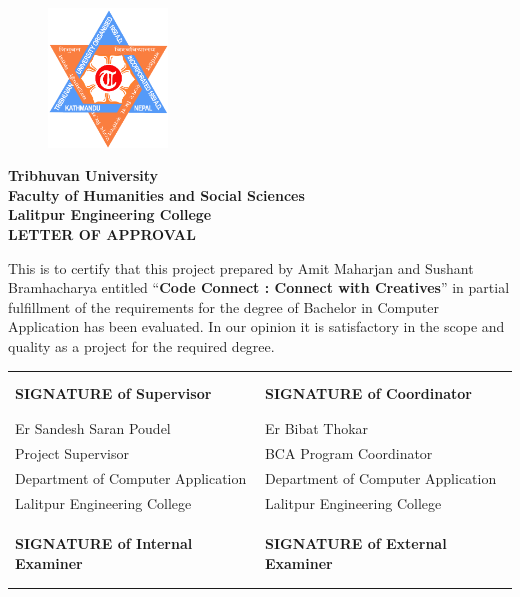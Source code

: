\begin{figure}
    \centering
    \includegraphics[width=1.25in]{img/Graphics/TUlogo.png}
\end{figure}
\begin{center}
    {\fontsize{14pt}{18}\selectfont
    \textbf{Tribhuvan University\\
    Faculty of Humanities and Social Sciences\\
    Lalitpur Engineering College\\
    \vspace{0.2in}
    LETTER OF APPROVAL\\}
    \vspace{0.2in}}
\end{center}
This is to certify that this project prepared by Amit Maharjan and Sushant Bramhacharya entitled “\textbf{Code Connect :  Connect with Creatives}” in partial fulfillment of the requirements for the degree of Bachelor in Computer Application has been evaluated. In our opinion it is satisfactory in the
scope and quality as a project for the required degree.\\
\begin{center}
    {\fontsize{14pt}{18}\selectfont
    \vspace{0.1in}
    \begin{table}[ht]
        \begin{tabularx}{\textwidth}{|Y|Y|}
        \hline
        &\\
        &\\
        \textbf{SIGNATURE of Supervisor}&\textbf{SIGNATURE of Coordinator}\\
        &\\
        &\\
        Er Sandesh Saran Poudel & Er Bibat Thokar \\
        Project Supervisor & BCA Program Coordinator \\
        Department of Computer Application & Department of Computer Application\\
        Lalitpur Engineering College & Lalitpur Engineering College \\
        &\\
        &\\
        \hline
        &\\
        \textbf{SIGNATURE of Internal Examiner}&\textbf{SIGNATURE of External Examiner}\\
        &\\
        &\\
        \hline
        \end{tabularx}
        \end{table}
        
    
    }
\end{center}
